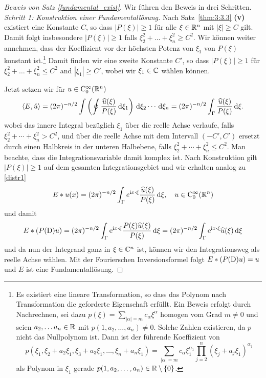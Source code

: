 \begin{proof}[Beweis von Satz \ref{fundamental_exist}]
Wir führen den Beweis in drei Schritten.\\
\noindent
{\em Schritt 1: Konstruktion einer Fundamentallösung.}
Nach Satz~\ref{thm:3:3.3} {\bf (v)} existiert eine Konstante $C$, so dass $|P(\xi)|\ge 1$ für alle $\xi\in \mathbb R^n$ mit $|\xi|\ge C$ gilt.  Damit folgt insbesondere 
$|P(\xi)|\ge 1$ falls $\xi_2^2+ \dots + \xi_n^2 \ge C^2$.  
Wir können weiter annehmen, dass der Koeffizient vor der höchsten Potenz von $\xi_1$ von $P(\xi)$ konstant ist.\footnote{Es existiert eine lineare Transformation, so dass das Polynom nach Transformation die geforderte Eigenschaft erfüllt. Ein Beweis erfolgt durch Nachrechnen, sei dazu $p(\xi)=\sum_{|\alpha|=m}c_\alpha \xi^\alpha$ homogen vom Grad $m\ne0$ und seien $a_2,\ldots a_{n}\in\mathbb R$ mit  $p(1,a_2,\ldots,a_n)\ne0$. Solche Zahlen existieren, da $p$ nicht das Nullpolynom ist. Dann ist der führende Koeffizient von
\[ p(\xi_1, \xi_2+a_2\xi_1, \xi_3+a_3\xi_1,\ldots,\xi_{n}+a_n\xi_1) =\sum_{|\alpha|=m} c_\alpha \xi_1^{\alpha_1} \prod_{j=2}^n  (\xi_j+a_j\xi_1)^{\alpha_j} \]
als Polynom in $\xi_1$ gerade $p(1,a_2,\ldots,a_n)\in\mathbb R\setminus\{0\}$.}
Damit finden wir eine zweite Konstante $C'$, so dass $|P(\xi)|\ge 1$ für $\xi_2^2+\dots + \xi_n^2\le C^2$ and $|\xi_1|\ge C'$, wobei wir $\xi_1\in\mathbb C$ wählen können.  

Jetzt setzen wir für $u\in\mathrm C_0^\infty(\mathbb R^n)$
\begin{equation}\label{distr3}
\langle E, \check u\rangle  = (2\pi)^{-n/2} \int\left( \oint \frac{\widehat u(\xi)}{P(\xi)} \,\mathrm d\xi_1\right) \,\mathrm d\xi_2 \cdots \,\mathrm d\xi_n 
= (2\pi)^{-n/2} \int_\Gamma \frac{\widehat u(\xi)}{P(\xi)} \,\mathrm d \xi.
\end{equation}
wobei das innere Integral bezüglich $\xi_1$ über die reelle Achse verlaufe, falls $\xi_2^2+ \cdots + \xi_n^2 > C^2$, und über die reelle Achse mit dem Intervall $(-C', C')$ ersetzt durch einen Halbkreis in der unteren Halbebene, falls $\xi_2^2+ \cdots+ \xi_n^2 \le C^2$. Man beachte, dass die Integrationsvariable damit komplex ist.
Nach Konstruktion gilt $|P(\xi)|\ge 1$ auf dem gesamten Integrationsgebiet und wir erhalten analog zu \eqref{distr1}
\begin{equation}
E*u(x) = (2\pi)^{-n/2}\int_\Gamma e^{\mathrm i x\cdot \xi } \frac{\widehat u(\xi)}{P(\xi)}\,\mathrm d \xi, \quad u \in \mathrm C_0^\infty(\mathbb R^n)
\end{equation} 
und damit 
\begin{equation}
E*(P(\mathrm D)u) = (2\pi)^{-n/2} \int_\Gamma \mathrm e^{\mathrm i x\cdot\xi}   \frac{P(\xi) \widehat{u} (\xi)}{P(\xi)}\,\mathrm d \xi=(2\pi)^{-n/2} \int_\Gamma \mathrm e^{\mathrm i x\cdot \xi} \widehat u(\xi) \,\mathrm d \xi
\end{equation}
und da nun der Integrand ganz in $\xi\in\mathbb C^n$ ist, können wir den Integrationsweg als reelle Achse wählen. Mit der Fourierschen Inversionsformel folgt
$E*(P(\mathrm D)u)=u$ und $E$ ist eine Fundamentallösung.


\end{proof}

